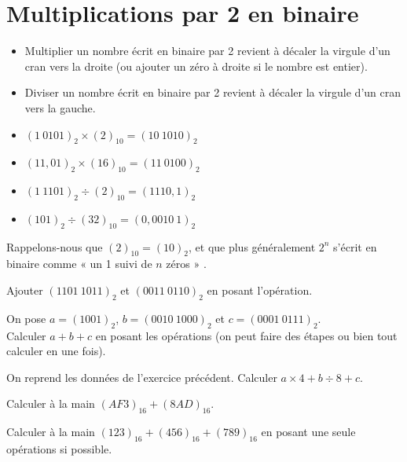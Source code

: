 \section{Multiplications par 2 en binaire}

\begin{propriete}[]
	\begin{itemize}
		\item 	Multiplier un nombre écrit en binaire par 2 revient à décaler la virgule d'un cran vers la droite (ou ajouter un zéro à droite si le nombre est entier).
		\item 	Diviser un nombre écrit en binaire par 2 revient à décaler la virgule d'un cran vers la gauche.
	\end{itemize}
\end{propriete}

\begin{exemple}[s]
	\begin{itemize}
		\item 	$(1\ 0101)_2\times (2)_{10}=(10\ 1010)_2$
		\item 	$(11,01)_2\times (16)_{10}=(11\ 0100)_2$
		\item 	$(1\ 1101)_2\div (2)_{10}=(1110,1)_2$
		\item 	$(101)_2\div (32)_{10}=(0,0010\ 1)_2$
	\end{itemize}
\end{exemple}

\begin{remarque}
	Rappelons-nous que $(2)_{10}=(10)_2$, et que plus généralement $2^n$ s'écrit en binaire comme «  un 1 suivi de $n$ zéros » .
\end{remarque}



\begin{exercice}[]
	Ajouter $(1101\ 1011)_2$ et $(0011\ 0110)_2$ en posant l'opération.
\end{exercice}

\begin{exercice}[]
	On pose  $a=(1001)_2$, $b=(0010\ 1000)_2$ et $c=(0001\ 0111)_2$.\\

	Calculer $a +b+c$ en posant les opérations (on peut faire des étapes ou bien tout calculer en une fois).

\end{exercice}

\begin{exercice}[]
	On reprend les données de l'exercice précédent.	Calculer $a\times 4+b\div 8 +c$.
\end{exercice}

\begin{exercice}[]
	Calculer à la main $(AF3)_{16}+(8AD)_{16}$.
\end{exercice}

\begin{exercice}[]
	Calculer à la main $(123)_{16}+(456)_{16}+(789)_{16}$ en posant une seule opérations si possible.
\end{exercice}

